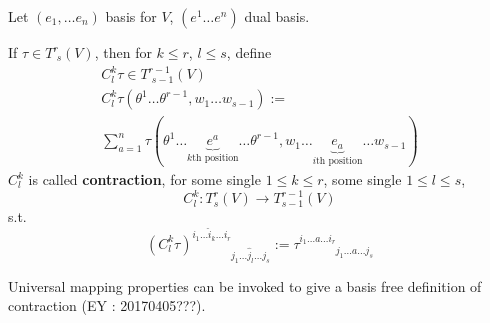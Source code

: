 \begin{definition}
Let $(e_1,\dots e_n)$ basis for $V$, $(e^1\dots e^n)$ dual basis.  

If $\tau \in T^r_{ \,\, s}(V)$, then for $k\leq r$, $l\leq s$, define 
\begin{equation}
\begin{gathered}
	C^k_l \tau \in T^{r-1}_{ \, \, s-1}(V) \\ 
 C^k_l\tau(\theta^1 \dots \theta^{r-1}, w_1\dots w_{s-1}) := \\
	\sum_{a=1}^n \tau(\theta^1 \dots \underbrace{e^a}_{\text{$k$th position} } \dots \theta^{r-1}, w_1 \dots \underbrace{e_a}_{\text{$i$th position}} \dots w_{s-1}  )
\end{gathered}
\end{equation}
$C^k_l$ is called \textbf{contraction}, for some single $1\leq k \leq r$, some single $1\leq l \leq s$, 
\[
C^k_l: T^r_s(V) \to T^{r-1}_{s-1}(V)
\]
s.t.
\[
(C^k_l\tau)^{i_1\dots \widehat{i}_k\dots i_r }_{ \phantom{i_1\dots \widehat{i}_k\dots i_r} j_1\dots \widehat{j}_l \dots j_s} := \tau^{i_1\dots a \dots i_r}_{ \phantom{i_1\dots a \dots i_r} j_1 \dots a \dots j_s }
\]
\end{definition}

Universal mapping properties can be invoked to give a basis free definition of contraction (EY : 20170405???).  

